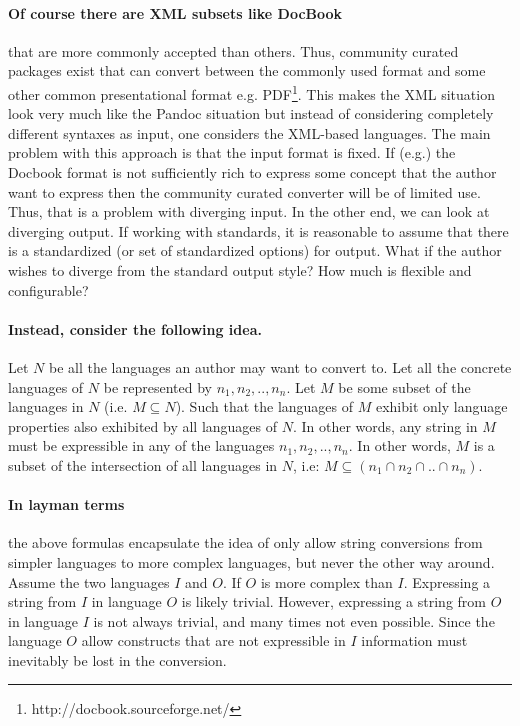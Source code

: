 \documentclass{scrreprt}
\begin{document}
\paragraph{Of course there are XML subsets like DocBook} that are more commonly accepted than others. Thus, community curated packages exist that can convert between the commonly used format and some other common presentational format e.g. PDF\footnote{http://docbook.sourceforge.net/}. This makes the XML situation look very much like the Pandoc situation but instead of considering completely different syntaxes as input, one considers the XML-based languages. The main problem with this approach is that the input format is fixed. If (e.g.) the Docbook format is not sufficiently rich to express some concept that the author want to express then the community curated converter will be of limited use. Thus, that is a problem with diverging input. In the other end, we can look at diverging output. If working with standards, it is reasonable to assume that there is a standardized (or set of standardized options) for output. What if the author wishes to diverge from the standard output style? How much is flexible and configurable?


\paragraph{Instead, consider the following idea.} Let $N$ be all the languages an author may want to convert to. Let all the concrete languages of $N$ be represented by $n_1, n_2, .., n_n$. Let $M$ be some subset of the languages in $N$ (i.e. $M \subseteq N$). Such that the languages of $M$ exhibit only language properties also exhibited by all languages of $N$. In other words, any string in $M$ must be expressible in any of the languages $n_1, n_2, .., n_n$. In other words, $M$ is a subset of the intersection of all languages in $N$, i.e: $M \subseteq (n_1 \cap n_2 \cap .. \cap n_n)$.


\paragraph{In layman terms} the above formulas encapsulate the idea of only allow string conversions from simpler languages to more complex languages, but never the other way around. Assume the two languages $I$ and $O$. If $O$ is more complex than $I$. Expressing a string from $I$ in language $O$ is likely trivial. However, expressing a string from $O$ in language $I$ is not always trivial, and many times not even possible. Since the language $O$ allow constructs that are not expressible in $I$ information must inevitably be lost in the conversion.
\end{document}
